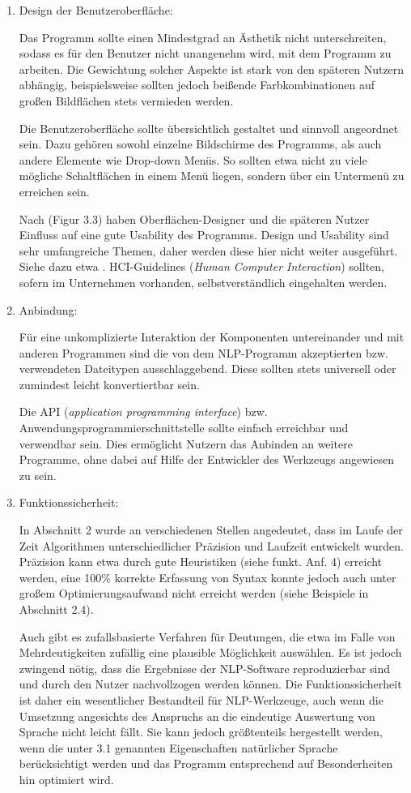 \documentclass[12pt]{report}
\begin{document}
\begin{enumerate}
\item Design der Benutzeroberfläche:

Das Programm sollte einen Mindestgrad an Ästhetik nicht unterschreiten, sodass es für den Benutzer nicht unangenehm wird, mit dem Programm zu arbeiten. Die Gewichtung solcher Aspekte ist stark von den späteren Nutzern abhängig, beispielsweise sollten jedoch \glqq  beißende\grqq{} Farbkombinationen auf großen Bildflächen stets vermieden werden. 

Die Benutzeroberfläche sollte übersichtlich gestaltet und sinnvoll angeordnet sein. Dazu gehören sowohl einzelne Bildschirme des Programms, als auch andere Elemente wie Drop-down Menüs. So sollten etwa nicht zu viele mögliche Schaltflächen in einem Menü liegen, sondern über ein Untermenü zu erreichen sein. 

Nach \cite{hm13} (Figur 3.3) haben Oberflächen-Designer und die späteren Nutzer Einfluss auf eine gute Usability des Programms. Design und Usability sind sehr umfangreiche Themen, daher werden diese hier nicht weiter ausgeführt. Siehe dazu etwa \cite{shn10}. HCI-Guidelines (\textit{Human Computer Interaction}) sollten, sofern im Unternehmen vorhanden, selbstverständlich eingehalten werden.

\item Anbindung:

Für eine unkomplizierte Interaktion der Komponenten untereinander und mit anderen Programmen sind die von dem NLP-Programm akzeptierten bzw. verwendeten Dateitypen ausschlaggebend. Diese sollten stets universell oder zumindest leicht konvertiertbar sein. 

Die API (\textit{application programming interface}) bzw. Anwendungsprogrammierschnittstelle sollte einfach erreichbar und verwendbar sein. Dies ermöglicht Nutzern das Anbinden an weitere Programme, ohne dabei auf Hilfe der Entwickler des Werkzeugs angewiesen zu sein. 
 
\item Funktionssicherheit:

In Abschnitt 2 wurde an verschiedenen Stellen angedeutet, dass im Laufe der Zeit Algorithmen unterschiedlicher Präzision und Laufzeit entwickelt wurden. Präzision kann etwa durch gute Heuristiken (siehe funkt. Anf. 4) erreicht werden, eine 100\% korrekte Erfassung von Syntax konnte jedoch auch unter großem Optimierungsaufwand nicht erreicht werden (siehe Beispiele in Abschnitt 2.4).  

Auch gibt es zufallsbasierte Verfahren für Deutungen, die etwa im Falle von Mehrdeutigkeiten zufällig eine plausible Möglichkeit auswählen. Es ist jedoch zwingend nötig, dass die Ergebnisse der NLP-Software reproduzierbar sind und durch den Nutzer nachvollzogen werden können. Die Funktionssicherheit ist daher ein wesentlicher Bestandteil für NLP-Werkzeuge, auch wenn die Umsetzung angesichts des Anspruchs an die eindeutige Auswertung von Sprache nicht leicht fällt. Sie kann jedoch größtenteils hergestellt werden, wenn die unter 3.1 genannten Eigenschaften natürlicher Sprache berücksichtigt werden und das Programm entsprechend auf Besonderheiten hin optimiert wird.


\end{enumerate}
\end{document}
